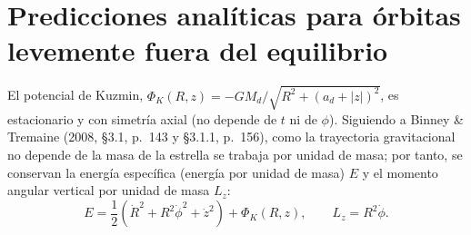 \documentclass[11pt,letterpaper]{article}
\begin{document}
\section{Predicciones analíticas para órbitas levemente fuera del equilibrio}

El potencial de Kuzmin, $\Phi_K(R, z) = -GM_d / \sqrt{R^2 + (a_d + |z|)^2}$, es estacionario y con simetría axial (no depende de $t$ ni de $\phi$). Siguiendo a Binney \& Tremaine (2008, \S 3.1, p.~143 y \S 3.1.1, p.~156), como la trayectoria gravitacional no depende de la masa de la estrella se trabaja por unidad de masa; por tanto, se conservan la energía específica (energía por unidad de masa) $E$ y el momento angular vertical por unidad de masa $L_z$:
\begin{equation}
    E = \frac{1}{2}\left(\dot{R}^2 + R^2\dot{\phi}^2 + \dot{z}^2\right) + \Phi_K(R, z),
    \qquad
    L_z = R^2\dot{\phi}.
\end{equation}
\end{document}
